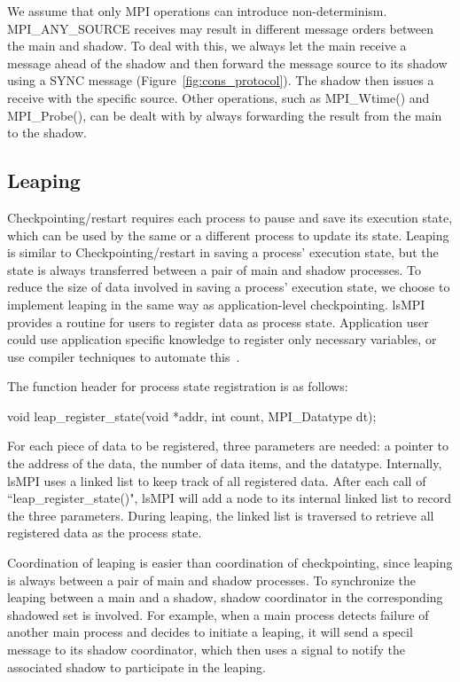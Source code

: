 We assume that only MPI operations can introduce non-determinism. MPI\_ANY\_SOURCE receives may result in different message orders between the main and shadow. To deal with this, we always let the main receive a message ahead of the shadow and then forward the message source to its shadow using a SYNC message (Figure~\ref{fig:cons_protocol}). 
The shadow then issues a receive with the specific source. Other operations, such as MPI\_Wtime() and MPI\_Probe(), can be dealt with by always forwarding the result from the main to the shadow.


\subsection{Leaping}
Checkpointing/restart requires each process to pause and save its execution state, which can be used by the same or a different process to update its state. Leaping is similar to Checkpointing/restart in saving a process' execution state, but the state is always transferred between a pair of main and shadow processes. 
To reduce the size of data involved in saving a process' execution state, we choose to implement leaping in the same way as application-level checkpointing. lsMPI provides a routine for users to register data as process state. Application user could use application specific knowledge to register only necessary variables, or use compiler techniques to automate this~\cite{5160999}. 

The function header for process state registration is as follows:

void leap\_register\_state(void *addr, int count, MPI\_Datatype dt);

For each piece of data to be registered, three parameters are needed: a pointer to the address of the data, the number of data items, and the datatype. Internally, lsMPI uses a linked list to keep track of all registered data. After each call of ``leap\_register\_state()", lsMPI will add a node to its internal linked list to record the three parameters. During leaping, the linked list is traversed to retrieve all registered data as the process state.

Coordination of leaping is easier than coordination of checkpointing, since leaping is always between a pair of main and shadow processes. To synchronize the leaping between a main and a shadow, shadow coordinator in the corresponding shadowed set is involved. For example, when a main process detects failure of another main process and decides to initiate a leaping, it will send a specil message to its shadow coordinator, which then uses a signal to notify the associated shadow to participate in the leaping. 

